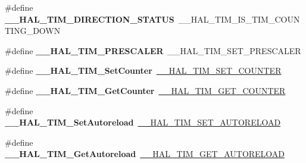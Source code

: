 \begin{DoxyCompactItemize}
\item 
\#define {\bfseries \+\_\+\+\_\+\+H\+A\+L\+\_\+\+T\+I\+M\+\_\+\+D\+I\+R\+E\+C\+T\+I\+O\+N\+\_\+\+S\+T\+A\+T\+US}~\+\_\+\+\_\+\+H\+A\+L\+\_\+\+T\+I\+M\+\_\+\+I\+S\+\_\+\+T\+I\+M\+\_\+\+C\+O\+U\+N\+T\+I\+N\+G\+\_\+\+D\+O\+WN\hypertarget{group___h_a_l___t_i_m___aliased___macros_ga76886ef4a5712e8627ea09ff564cdff2}{}\label{group___h_a_l___t_i_m___aliased___macros_ga76886ef4a5712e8627ea09ff564cdff2}

\item 
\#define {\bfseries \+\_\+\+\_\+\+H\+A\+L\+\_\+\+T\+I\+M\+\_\+\+P\+R\+E\+S\+C\+A\+L\+ER}~\+\_\+\+\_\+\+H\+A\+L\+\_\+\+T\+I\+M\+\_\+\+S\+E\+T\+\_\+\+P\+R\+E\+S\+C\+A\+L\+ER\hypertarget{group___h_a_l___t_i_m___aliased___macros_ga64fdbe2a68fc8459071ee0dcb9096e34}{}\label{group___h_a_l___t_i_m___aliased___macros_ga64fdbe2a68fc8459071ee0dcb9096e34}

\item 
\#define {\bfseries \+\_\+\+\_\+\+H\+A\+L\+\_\+\+T\+I\+M\+\_\+\+Set\+Counter}~\hyperlink{group___t_i_m___exported___macros_ga9746ac75e4cd25cec1a9ebac8cb82b97}{\+\_\+\+\_\+\+H\+A\+L\+\_\+\+T\+I\+M\+\_\+\+S\+E\+T\+\_\+\+C\+O\+U\+N\+T\+ER}\hypertarget{group___h_a_l___t_i_m___aliased___macros_ga23ef14334077dc01d9e6d8bfa6614260}{}\label{group___h_a_l___t_i_m___aliased___macros_ga23ef14334077dc01d9e6d8bfa6614260}

\item 
\#define {\bfseries \+\_\+\+\_\+\+H\+A\+L\+\_\+\+T\+I\+M\+\_\+\+Get\+Counter}~\hyperlink{group___t_i_m___exported___macros_gaf1af08014b9d06efbbb091d58d47c8ba}{\+\_\+\+\_\+\+H\+A\+L\+\_\+\+T\+I\+M\+\_\+\+G\+E\+T\+\_\+\+C\+O\+U\+N\+T\+ER}\hypertarget{group___h_a_l___t_i_m___aliased___macros_ga074ff6af2efe776a0e76622bf8d4c85a}{}\label{group___h_a_l___t_i_m___aliased___macros_ga074ff6af2efe776a0e76622bf8d4c85a}

\item 
\#define {\bfseries \+\_\+\+\_\+\+H\+A\+L\+\_\+\+T\+I\+M\+\_\+\+Set\+Autoreload}~\hyperlink{group___t_i_m___exported___macros_ga1e6300cab1e34ecaaf490dc7d4812d69}{\+\_\+\+\_\+\+H\+A\+L\+\_\+\+T\+I\+M\+\_\+\+S\+E\+T\+\_\+\+A\+U\+T\+O\+R\+E\+L\+O\+AD}\hypertarget{group___h_a_l___t_i_m___aliased___macros_ga8857297381807be432e6b6eb98fdb591}{}\label{group___h_a_l___t_i_m___aliased___macros_ga8857297381807be432e6b6eb98fdb591}

\item 
\#define {\bfseries \+\_\+\+\_\+\+H\+A\+L\+\_\+\+T\+I\+M\+\_\+\+Get\+Autoreload}~\hyperlink{group___t_i_m___exported___macros_gaa7a5c7645695bad15bacd402513a028a}{\+\_\+\+\_\+\+H\+A\+L\+\_\+\+T\+I\+M\+\_\+\+G\+E\+T\+\_\+\+A\+U\+T\+O\+R\+E\+L\+O\+AD}\hypertarget{group___h_a_l___t_i_m___aliased___macros_gae96afd3a280ee1faf2551537e6618ee4}{}\label{group___h_a_l___t_i_m___aliased___macros_gae96afd3a280ee1faf2551537e6618ee4}


\end{DoxyCompactItemize}
